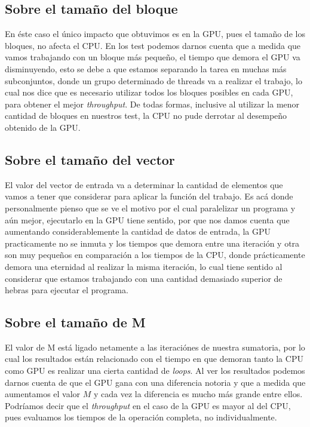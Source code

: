 \subsection{Sobre el tamaño del bloque}

En éste caso el único impacto que obtuvimos es en la GPU,
pues el tamaño de los bloques, no afecta el CPU.
En los test podemos darnos cuenta que a medida que vamos
trabajando con un bloque más pequeño, el tiempo que demora
el GPU va disminuyendo, esto se debe a que estamos separando
la tarea en muchas más subconjuntos, donde un grupo determinado
de threads va a realizar el trabajo, lo cual nos dice que
es necesario utilizar todos los bloques posibles en cada GPU,
para obtener el mejor \emph{throughput}.
De todas formas, inclusive al utilizar la menor cantidad de bloques
en nuestros test, la CPU no pude derrotar al desempeño obtenido de la GPU.

\subsection{Sobre el tamaño del vector}

El valor del vector de entrada va a determinar la cantidad de elementos
que vamos a tener que considerar para aplicar la función del trabajo.
Es acá donde personalmente pienso que se ve el motivo por el cual
paralelizar un programa y aún mejor, ejecutarlo en la GPU tiene sentido,
por que nos damos cuenta que aumentando considerablemente la cantidad
de datos de entrada, la GPU practicamente no se inmuta y los tiempos
que demora entre una iteración y otra son muy pequeños en comparación
a los tiempos de la CPU, donde prácticamente demora una eternidad
al realizar la misma iteración, lo cual tiene sentido al considerar
que estamos trabajando con una cantidad demasiado superior de hebras
para ejecutar el programa.

\subsection{Sobre el tamaño de M}

El valor de M está ligado netamente a las iteraciónes de nuestra sumatoria,
por lo cual los resultados están relacionado con el tiempo en que demoran
tanto la CPU como GPU es realizar una cierta cantidad de \emph{loops}.
Al ver los resultados podemos darnos cuenta de que el GPU gana con una
diferencia notoria y que a medida que aumentamos el valor $M$ y cada
vez la diferencia es mucho más grande entre ellos.
Podríamos decir que el \emph{throughput} en el caso de la GPU es mayor
al del CPU, pues evaluamos los tiempos de la operación completa, no individualmente.

